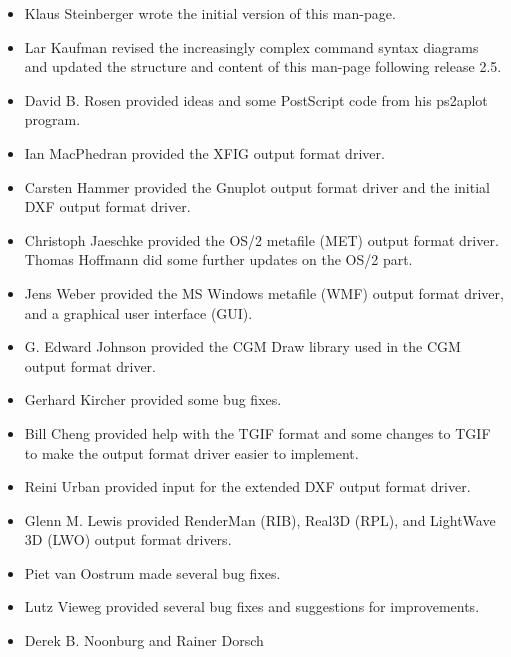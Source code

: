 \documentclass[english,a4paper]{article}
\begin{document}
\begin{itemize}\setlength{\itemsep}{0cm}
  \item Klaus Steinberger 
     wrote the initial version of this man-page.
  \item Lar Kaufman revised the increasingly complex
     command syntax diagrams and updated the structure and content of this
     man-page following release 2.5.
  \item David B. Rosen  provided ideas and some PostScript
     code from his ps2aplot program.
  \item Ian MacPhedran  provided the XFIG
     output format driver.
  \item Carsten Hammer  provided the
     Gnuplot output format driver and the initial DXF output format driver.
  \item Christoph Jaeschke provided the OS/2 metafile (MET) output format driver.
  Thomas Hoffmann  did some further updates on the OS/2 part.
  \item Jens Weber  provided the MS Windows metafile (WMF)
     output format driver, and a graphical user interface (GUI).
  \item G. Edward Johnson  provided the CGM Draw library
     used in the CGM output format driver.
  \item Gerhard Kircher  provided some bug
     fixes.
  \item Bill Cheng  provided help with the TGIF
     format and some changes to TGIF to make the output format driver easier to implement.
  \item Reini Urban  provided input for the
     extended DXF output format driver.
  \item Glenn M. Lewis  provided RenderMan (RIB),
     Real3D (RPL), and LightWave 3D (LWO) output format drivers.
  \item Piet van Oostrum  made several bug fixes.
  \item Lutz Vieweg  provided several bug fixes and
     suggestions for improvements.
  \item Derek B. Noonburg  and Rainer Dorsch

\end{itemize}
\end{document}
